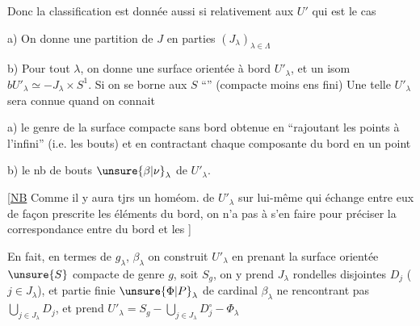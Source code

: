 
Donc la classification est donnée aussi  si relativement aux $U'$ qui est le cas

a) On donne une partition \inserted{$\pi$} de $J$ en parties $(J_\lambda)_{\lambda\in\Lambda}$

b) Pour tout $\lambda$, on donne une  surface orientée  à bord $U'_\lambda$, et un isom $bU'_\lambda\simeq-J_\lambda\times S^1$. Si on se borne aux $S$ ``'' (compacte moins ens fini) Une telle $U'_\lambda$ sera connue quand on connait

a) le genre  de la surface compacte sans bord obtenue en ``rajoutant les points à l'infini'' (i.e. les bouts) et en contractant chaque composante du bord en un point

b) le nb de bouts $\unsure{\beta|\nu}_\lambda$ de $U'_\lambda$.

[\uline{NB} Comme il y aura tjrs un homéom.  de $U'_\lambda$ sur lui-même  qui échange entre eux de façon prescrite les éléments du bord, on n'a pas à s'en faire pour préciser la  correspondance entre   du bord et les   ]

En fait, en termes de $g_\lambda$, $\beta_\lambda$ on construit $U'_\lambda$ en prenant la surface  orientée $\unsure{S}$ compacte de genre $g$, soit $S_g$, on y prend $J_\lambda$ rondelles disjointes $D_j$ ($j\in J_\lambda$), et  partie  finie $\unsure{\Phi|P}_\lambda$ de cardinal $\beta_\lambda$ ne rencontrant pas $\bigcup_{j\in J_\lambda}D_j$, et prend $U'_\lambda=S_g-\bigcup_{j\in J_\lambda}D_j^\circ-\Phi_\lambda$

